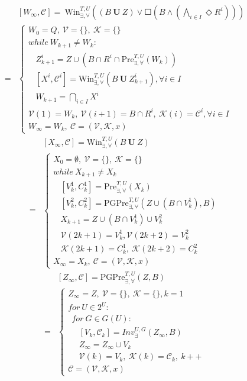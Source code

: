 \begin{align}
&[W_{\infty},\mathcal{C}]= \ \text{Win}_{\exists,\forall}^{T,U}((B\mathbf{\ U\ }Z)\vee \Square (B\wedge(\bigwedge_{i\in I}\Diamond R^i)) )\\
=&\begin{cases}
W_0 = Q,\ \mathcal{V}=\{\},\ \mathcal{K}=\{\}\\
while\ W_{k+1}\not= W_k:\\
\ \ \ \ Z_{k+1}^i = Z\cup (B\cap R^i\cap \text{Pre}_{\exists, \forall}^{T,U}(W_k))\\
\ \ \ \ [X^i, \mathcal{C}^i]= \text{Win}_{\exists,\forall}^{T,U} (B\mathbf{\ U\ }Z_{k+1}^i), \forall i \in I\\
\ \ \ \ W_{k+1} = \bigcap_{i\in I} X^i\\
\mathcal{V}(1)=W_k,\ \mathcal{V}(i+1) = B\cap R^i,\ 
\mathcal{K}(i) = \mathcal{C}^i, \forall i\in I\\
W_{\infty} = W_k,\ \mathcal{C} = (\mathcal{V},\mathcal{K},x)
\end{cases}\label{win_interm}
\end{align}
\begin{align}
&[X_{\infty},\mathcal{C}]= \text{Win}_{\exists,\forall}^{T,U} (B\mathbf{\ U\ }Z)\\
=&\begin{cases}
X_0 = \emptyset,\ \mathcal{V}=\{\},\ \mathcal{K}=\{\}\\
while\ X_{k+1}\not= X_k\\
\ \ \ \ [V^1_k,C^1_k]=
\text{Pre}_{\exists,\forall}^{T,U}(X_k)\\
\ \ \ \  [V^2_k,C^2_k]=\text{PGPre}_{\exists,\forall}^{T,U}(Z\cup(B\cap V^1_k),B)\\
\ \ \ \ X_{k+1} =Z\cup (B\cap V^1_k)\cup V^2_k\\
\ \ \ \ \mathcal{V}(2k+1)=V^1_k, \mathcal{V}(2k+2)=V^2_k\\
\ \ \ \ \mathcal{K}(2k+1)=C^1_k,\ \mathcal{K}(2k+2)=C^2_k\\
X_{\infty}=X_k,\ \mathcal{C} = (\mathcal{V},\mathcal{K},x)
\end{cases}\label{win_until}
\end{align}
\begin{align}
&[Z_{\infty},\mathcal{C}]=\text{PGPre}_{\exists,\forall}^{T,U} (Z,B)\\
=&\begin{cases}
Z_{\infty} = Z,\ \mathcal{V} = \{\},\ \mathcal{K}=\{\}, k = 1\\
for\ U\in 2^U:\\
\ \ for\ G\in G(U):\\
\ \ \ \ \ \  [V_k,\mathcal{C}_k]=Inv_{\exists}^{U,G}(Z_{\infty},B)\\
\ \ \ \ \ \ Z_{\infty} = Z_{\infty} \cup V_k\\
\ \ \ \ \ \ \mathcal{V}(k)=V_k,\ \mathcal{K}(k)=\mathcal{C}_k,\ k++\\
\mathcal{C} = (\mathcal{V},\mathcal{K},x)
\end{cases}\label{win_pgpre}
\end{align}
